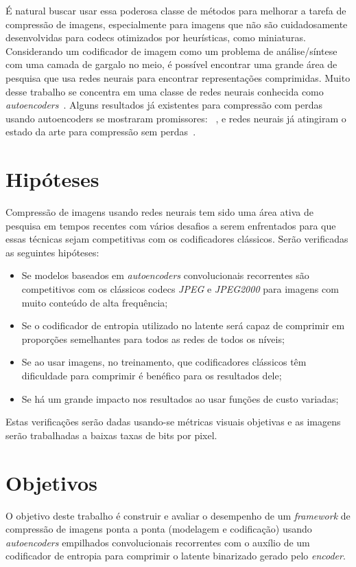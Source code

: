 É natural buscar usar essa poderosa classe de métodos para melhorar a tarefa de compressão de imagens, especialmente para imagens que não são cuidadosamente desenvolvidas para codecs otimizados por heurísticas, como miniaturas. Considerando um codificador de imagem como um problema de análise/síntese com uma camada de gargalo no meio, é possível encontrar uma grande área de pesquisa que usa redes neurais para encontrar representações comprimidas. Muito desse trabalho se concentra em uma classe de redes neurais conhecida como \emph{autoencoders}~\cite{autoencoder2011}. Alguns resultados já existentes para compressão com perdas usando autoencoders se mostraram promissores: ~\cite{gregor2016towards, FullResolution2017Toderici, Variable2016Toderici}, e redes neurais já atingiram o estado da arte para compressão sem perdas~\cite{mentzer2019, theis2015generative}. 
\section{Hipóteses}
\label{sec:hipotese}
Compressão de imagens usando redes neurais tem sido uma área ativa de pesquisa em tempos recentes com vários desafios a serem enfrentados para que essas técnicas sejam competitivas com os codificadores clássicos. Serão verificadas as seguintes hipóteses:
\begin{itemize}
    \item Se modelos baseados em \textit{autoencoders} convolucionais recorrentes são competitivos com os clássicos codecs \textit{JPEG} e \textit{JPEG2000} para imagens com muito conteúdo de alta frequência;
    \item Se o codificador de entropia utilizado no latente será capaz de comprimir em proporções semelhantes para todos as redes de todos os níveis;
    \item Se ao usar imagens, no treinamento, que codificadores clássicos têm dificuldade para comprimir é benéfico para os resultados dele;
    \item Se há um grande impacto nos resultados ao usar funções de custo variadas;
\end{itemize}

Estas verificações serão dadas usando-se métricas visuais objetivas e as imagens serão trabalhadas a baixas taxas de bits por pixel.
\section{Objetivos}
\label{sec:objetivos}
O objetivo deste trabalho é construir e avaliar o desempenho de um \textit{framework} de compressão de imagens ponta a ponta (modelagem e codificação) usando \textit{autoencoders} empilhados convolucionais recorrentes com o auxílio de um codificador de entropia para comprimir o latente binarizado gerado pelo \textit{encoder}. 

